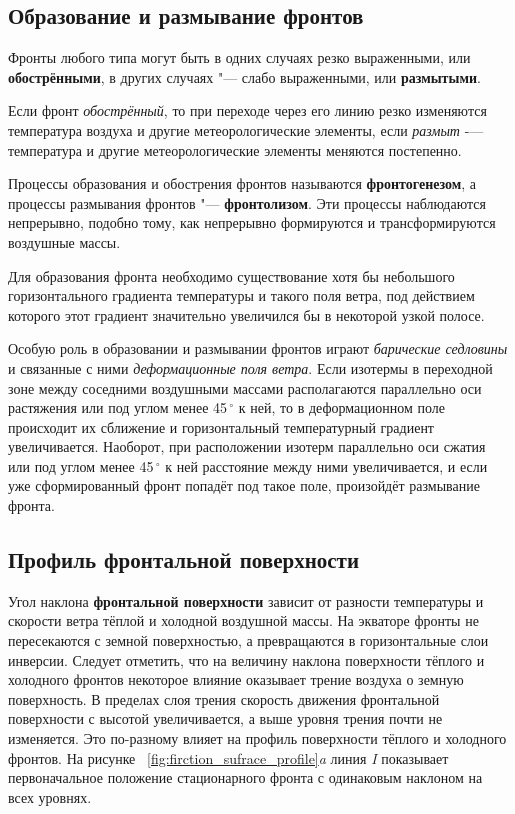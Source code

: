 \documentclass[a4paper, 12pt, twoside, draft, book, russian, fittopage, cyremdash, openright]{ncc}
\newcommand{\gr}{\ensuremath{\,^\circ}\xspace}
\begin{document}
\subsection{Образование и размывание фронтов}
\label{sec:makes_fronts}

Фронты любого типа могут быть в одних случаях резко выраженными, или
\textbf{обострёнными}, в других случаях "--- слабо
выраженными, или \textbf{размытыми}.

Если фронт \textit{обострённый}, то при переходе через его линию резко
изменяются температура воздуха и другие метеорологические элементы,
если \textit{размыт} \--— температура и другие метеорологические
элементы меняются постепенно.

Процессы образования и обострения фронтов называются
\textbf{фронтогенезом}, а процессы размывания
фронтов "--- \textbf{фронтолизом}. Эти процессы
наблюдаются непрерывно, подобно тому, как непрерывно формируются и
трансформируются воздушные массы.

Для образования фронта необходимо существование хотя бы небольшого
горизонтального градиента температуры и такого поля ветра, под
действием которого этот градиент значительно увеличился бы в некоторой
узкой полосе.

Особую роль в образовании и размывании фронтов играют \textit{барические
седловины} и связанные с ними \textit{деформационные поля ветра}. Если изотермы
в переходной зоне между соседними воздушными массами располагаются
параллельно оси растяжения или под углом менее 45\gr к ней, то в
деформационном поле происходит их сближение и горизонтальный
температурный градиент увеличивается. Наоборот, при расположении
изотерм параллельно оси сжатия или под углом менее 45\gr к ней
расстояние между ними увеличивается, и если уже сформированный фронт
попадёт под такое поле, произойдёт размывание фронта.

\subsection{Профиль фронтальной поверхности}
\label{sec:frontal_surface_profile}

Угол наклона \textbf{фронтальной поверхности} зависит от разности
температуры и скорости ветра тёплой и холодной воздушной массы. На
экваторе фронты не пересекаются с земной поверхностью, а превращаются
в горизонтальные слои инверсии. Следует отметить, что на величину
наклона поверхности тёплого и холодного фронтов некоторое влияние
оказывает трение воздуха о земную поверхность. В пределах слоя трения
скорость движения фронтальной поверхности с высотой увеличивается, а
выше уровня трения почти не изменяется. Это по-разному влияет на
профиль поверхности тёплого и холодного фронтов. На рисунке
~\ref{fig:firction_sufrace_profile}\textit{a} линия \textit{I}
показывает первоначальное положение стационарного фронта с одинаковым
наклоном на всех уровнях.
\end{document}
